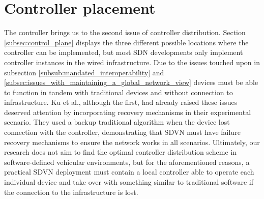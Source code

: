     \section{Controller placement}
    The controller brings us to the second issue of controller distribution. Section \ref{subsec:control_plane} displays the three different possible locations where the controller can be implemented, but most SDN developments only implement controller instances in the wired infrastructure. Due to the issues touched upon in subsection \ref{subsub:mandated_interoperability} and \ref{subsec:issues_with_maintaining_a_global_network_view} devices must be able to function in tandem with traditional devices and without connection to infrastructure. 
    Ku et al.\cite{ku_towards_2014}, although the first, had already raised these issues deserved attention by incorporating recovery mechanisms in their experimental scenario. They used a backup traditional algorithm when the device lost connection with the controller, demonstrating that SDVN must have failure recovery mechanisms to ensure the network works in all scenarios.
    Ultimately, our research does not aim to find the optimal controller distribution scheme in software-defined vehicular environments, but for the aforementioned reasons, a practical SDVN deployment must contain a local controller able to operate each individual device and take over with something similar to traditional software if the connection to the infrastructure is lost. 
    